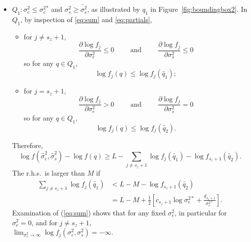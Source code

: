 \documentclass{report}
\newcommand{\RL}{f}
\newcommand{\logRL}{\log\RL}
\newcommand{\sigssq}{\sigma_s^2}
\newcommand{\sigesq}{\sigma_e^2}
\newcommand{\sshat}{\hat\sigma^2_e,\hat\sigma^2_s}
\begin{document}
\begin{itemize}
\item $Q_1: \sigesq \le \sigesq{}^*$ and $\sigssq \ge \widetilde{\sigssq}$, as illustrated by $q_1$ in
  Figure~\ref{fig:boundingbox2}.  In $Q_1$, by inspection of \eqref{eq:sum} and \eqref{eq:partials},
  \begin{itemize}
  \item for $j \ne s_z+1$,
    \begin{equation*}
      \frac{\partial\logRL_j}{\partial\sigesq} \le 0 \hspace{1cm} \text{and} \hspace{1cm}
      \frac{\partial\logRL_j}{\partial\sigssq} \le 0
    \end{equation*}
    so for any $q \in Q_1$,
    \begin{equation*}
      \logRL_j(q) \le \logRL_j(\widetilde{q_1});
    \end{equation*}
  \item  for $j = s_z+1$,
    \begin{equation*}
      \frac{\partial\logRL_j}{\partial\sigesq} > 0 \hspace{1cm} \text{and} \hspace{1cm}
      \frac{\partial\logRL_j}{\partial\sigssq} = 0
    \end{equation*}
    so for any $q \in Q_1$,
    \begin{equation*}
      \logRL_j(q) \le \logRL_j(\widetilde{q_2}).
    \end{equation*}
  \end{itemize}
  Therefore, 
  \begin{equation}
	\logRL(\sshat) - \logRL(q) \ge L - \sum_{j \ne s_z+1} \logRL_j(\widetilde{q_1}) - \logRL_{s_z+1}(\widetilde{q_2}).
  \end{equation}
  The r.h.s.~is larger than $M$ if
  \begin{equation}
    \label{eq:q1}
    \begin{split}
      \sum_{j \ne s_z+1} \logRL_j(\widetilde{q_1})
        &< L - M - \logRL_{s_z+1}(\widetilde{q_2})\\
        &= L - M + \frac{1}{2} \left[ c_{s_z+1}\log\sigma_e^{2*} + \frac{d_{s_z+1}}{\sigma_e^{2*}}\right].
    \end{split}
  \end{equation}
  Examination of (\ref{eq:sum}) shows that for any fixed $\sigesq$, in particular for $\sigesq=0$,
  and for $j \ne s_z+1$,\\ $\lim_{\sigssq \rightarrow \infty} \logRL_j(\sigesq,\sigssq) = -\infty$.

\end{itemize}
\end{document}
